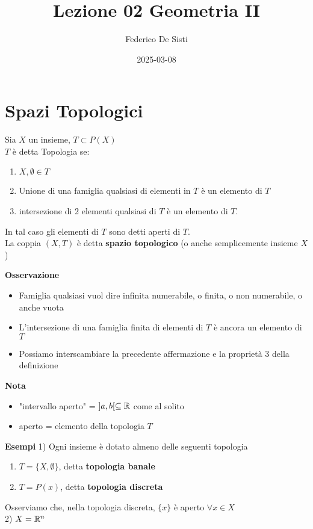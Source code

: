 \documentclass[12px]{article}
\title{Lezione 02 Geometria II}
\date{2025-03-08}
\author{Federico De Sisti}
\begin{document}
	\maketitle
	\newpage
	\section{Spazi Topologici}
	\begin{defi}[Topologia]
		Sia $X$ un insieme, $T\subset P(X)$\\
		 $T$ è detta Topologia se:
		 \begin{enumerate}
			 \item $X,\emptyset\in T$
			 \item Unione di una famiglia qualsiasi di elementi in  $T$ è un elemento di $T$ 
			 \item intersezione di 2 elementi qualsiasi di $T$ è un elemento di $T$.
		 \end{enumerate}
		 In tal caso gli elementi di $T$ sono detti aperti di $T$.\\
		 La coppia $(X,T)$ è detta \textbf{spazio topologico} (o anche semplicemente insieme $X$)
	\end{defi}
	\textbf{Osservazione}
	\begin{itemize}
		\item Famiglia qualsiasi vuol dire infinita numerabile, o finita, o non numerabile, o anche vuota
		\item L'intersezione di una famiglia finita di elementi di $T$ è ancora un elemento di $T$ 
		\item Possiamo interscambiare la precedente affermazione e la proprietà 3 della definizione
	\end{itemize}
	\textbf{Nota}
	\begin{itemize}
		\item "intervallo aperto" = $]a,b[\subseteq\mathbb{R}$ come al solito
		\item aperto = elemento della topologia $T$
	\end{itemize}
	\textbf{Esempi}
	1) Ogni insieme è dotato almeno delle seguenti topologia
	\begin{enumerate}
		\item $T = \{X,\emptyset\}$, detta \textbf{topologia banale}
		\item $T = P(x)$, detta \textbf{topologia discreta}
	\end{enumerate}
	Osserviamo che, nella topologia discreta, $\{x\}$ è aperto $\forall x\in X$\\
	2)  $X = \mathbb{R}^n$\\
\end{document}
